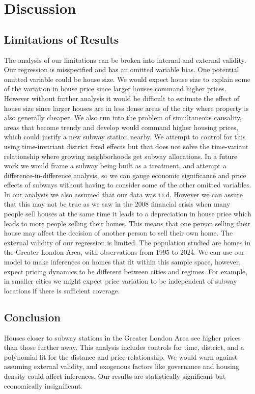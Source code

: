\section{Discussion}
\label{sec:conclusion}
\subsection{Limitations of Results}
The analysis of our limitations can be broken into internal and external validity.
 Our regression is misspecified and has an omitted variable bias.
  One potential omitted variable could be house size.
   We would expect house size to explain some of the variation in house price since larger houses command higher prices.
    However without further analysis it would be difficult to estimate the effect of house size since larger houses are in less dense areas of the city where property is also generally cheaper.
     We also run into the problem of simultaneous causality, areas that become trendy and develop would command higher housing prices, 
     which could justify a new subway station nearby. We attempt to control for this using time-invariant district fixed effects 
     but that does not solve the time-variant relationship where growing neighborhoods get subway allocations.
      In a future work we would frame a subway being built as a treatment, and attempt a difference-in-difference analysis, 
      so we can gauge economic significance and price effects of subways without having to consider some of the other omitted variables.
In our analysis we also assumed that our data was i.i.d. However we can assure that this may not be true as we 
saw in the 2008 financial crisis when many people sell houses at the same time it leads to a depreciation in 
house price which leads to more people selling their homes. This means that one person selling their house may 
affect the decision of another person to sell their own home.
The external validity of our regression is limited. The population studied are homes in the Greater London Area, 
with observations from 1995 to 2024. We can use our model to make inferences on homes that fit within this sample space, 
however, expect pricing dynamics to be different between cities and regimes. For example, in smaller cities we might expect 
price variation to be independent of subway locations if there is sufficient coverage.


\subsection{Conclusion}
Houses closer to subway stations in the Greater London Area see higher prices than those further away. 
This analysis includes controls for time, district, and a polynomial fit for the distance and price relationship. 
We would warn against assuming external validity, and exogenous factors like governance and housing density could affect inferences. 
Our results are statistically significant but economically insignificant.